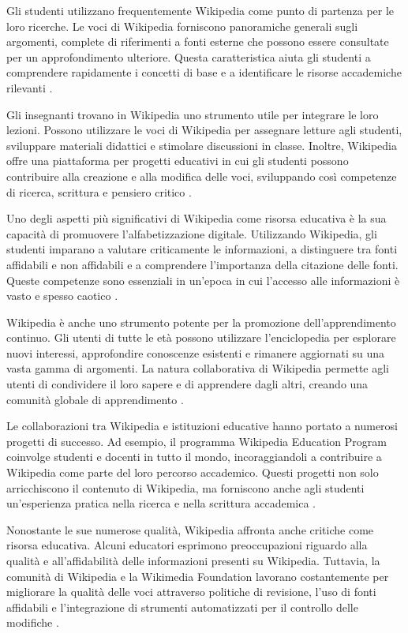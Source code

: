 \documentclass[12pt,a4paper]{report}
\begin{document}
Gli studenti utilizzano frequentemente Wikipedia come punto di partenza per le loro ricerche. Le voci di Wikipedia forniscono panoramiche generali sugli argomenti, complete di riferimenti a fonti esterne che possono essere consultate per un approfondimento ulteriore. Questa caratteristica aiuta gli studenti a comprendere rapidamente i concetti di base e a identificare le risorse accademiche rilevanti \cite{denning2005wikipedia}.

Gli insegnanti trovano in Wikipedia uno strumento utile per integrare le loro lezioni. Possono utilizzare le voci di Wikipedia per assegnare letture agli studenti, sviluppare materiali didattici e stimolare discussioni in classe. Inoltre, Wikipedia offre una piattaforma per progetti educativi in cui gli studenti possono contribuire alla creazione e alla modifica delle voci, sviluppando così competenze di ricerca, scrittura e pensiero critico \cite{jemielniak2014wikipedia}.

Uno degli aspetti più significativi di Wikipedia come risorsa educativa è la sua capacità di promuovere l'alfabetizzazione digitale. Utilizzando Wikipedia, gli studenti imparano a valutare criticamente le informazioni, a distinguere tra fonti affidabili e non affidabili e a comprendere l'importanza della citazione delle fonti. Queste competenze sono essenziali in un'epoca in cui l'accesso alle informazioni è vasto e spesso caotico \cite{lih2009wikipedia}.

Wikipedia è anche uno strumento potente per la promozione dell'apprendimento continuo. Gli utenti di tutte le età possono utilizzare l'enciclopedia per esplorare nuovi interessi, approfondire conoscenze esistenti e rimanere aggiornati su una vasta gamma di argomenti. La natura collaborativa di Wikipedia permette agli utenti di condividere il loro sapere e di apprendere dagli altri, creando una comunità globale di apprendimento \cite{history_of_wikis}.

Le collaborazioni tra Wikipedia e istituzioni educative hanno portato a numerosi progetti di successo. Ad esempio, il programma Wikipedia Education Program coinvolge studenti e docenti in tutto il mondo, incoraggiandoli a contribuire a Wikipedia come parte del loro percorso accademico. Questi progetti non solo arricchiscono il contenuto di Wikipedia, ma forniscono anche agli studenti un'esperienza pratica nella ricerca e nella scrittura accademica \cite{jemielniak2014wikipedia}.

Nonostante le sue numerose qualità, Wikipedia affronta anche critiche come risorsa educativa. Alcuni educatori esprimono preoccupazioni riguardo alla qualità e all'affidabilità delle informazioni presenti su Wikipedia. Tuttavia, la comunità di Wikipedia e la Wikimedia Foundation lavorano costantemente per migliorare la qualità delle voci attraverso politiche di revisione, l'uso di fonti affidabili e l'integrazione di strumenti automatizzati per il controllo delle modifiche \cite{denning2005wikipedia}.
\end{document}
